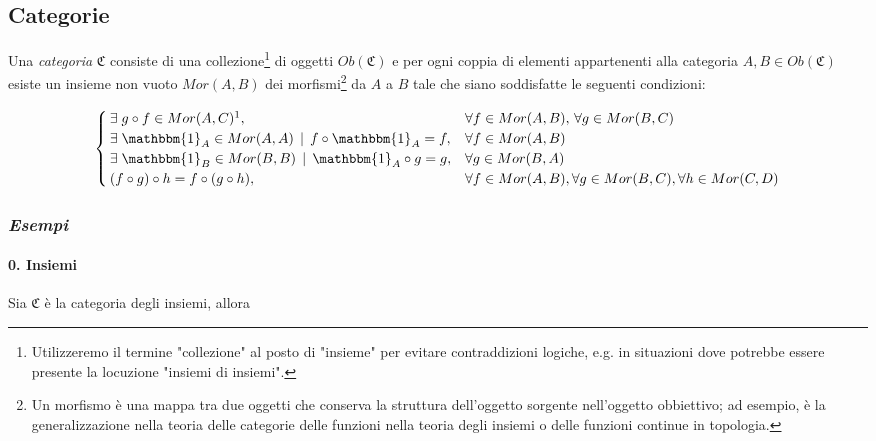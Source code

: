 \subsection{Categorie}

Una \textit{categoria} $ \mathfrak{C} $ consiste di una collezione\footnote{%
	Utilizzeremo il termine "collezione" al posto di "insieme" per evitare contraddizioni logiche, e.g. in situazioni dove potrebbe essere presente la locuzione "insiemi di insiemi".%
} di oggetti $ Ob(\mathfrak{C}) $ e per ogni coppia di elementi appartenenti alla categoria $ A,B \in Ob(\mathfrak{C}) $ esiste un insieme non vuoto $ Mor(A,B) $ dei morfismi\footnote{%
	Un morfismo è una mappa tra due oggetti che conserva la struttura dell'oggetto sorgente nell'oggetto obbiettivo; ad esempio, è la generalizzazione nella teoria delle categorie delle funzioni nella teoria degli insiemi o delle funzioni continue in topologia.%
} da $ A $ a $ B $ tale che siano soddisfatte le seguenti condizioni:

\begin{equation}
	\begin{cases}
		\E g \circ f \in Mor(A,C)\footnotemark, & \forall f \in Mor(A,B), \, \forall g \in Mor(B,C)\\
		\E \mathbbm{1}_{A} \in Mor(A,A) \, \mid \, f \circ \mathbbm{1}_{A} = f, & \forall f \in Mor(A,B)\\
		\E \mathbbm{1}_{B} \in Mor(B,B) \, \mid \, \mathbbm{1}_{A} \circ g = g, & \forall g \in Mor(B,A)\\
		(f \circ g) \circ h = f \circ (g \circ h), & \forall f \in Mor(A,B), \forall g \in Mor(B,C), \forall h \in Mor(C,D)
	\end{cases}
\footnotetext{Il simbolo $ \circ $ indica la composizione ma, nella teoria delle categorie, non è necessariamente la composizione come si intende per le funzioni in teoria degli insiemi; nonostante ciò, vedremo solo esempi in cui le due composizioni sopraccitate coincidono.}
\end{equation}

\subsubsection{\textit{Esempi}}

\paragraph{0. Insiemi}

Sia $ \mathfrak{C} $ è la categoria degli insiemi, allora

